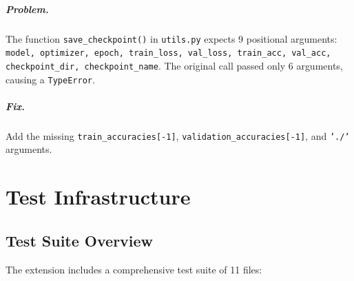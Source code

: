 \documentclass[11pt, a4paper]{report}
\begin{document}
\paragraph{Problem.} The function \texttt{save\_checkpoint()} in \texttt{utils.py} expects 9 positional arguments: \texttt{model, optimizer, epoch, train\_loss, val\_loss, train\_acc, val\_acc, checkpoint\_dir, checkpoint\_name}. The original call passed only 6 arguments, causing a \texttt{TypeError}.

\paragraph{Fix.} Add the missing \texttt{train\_accuracies[-1]}, \texttt{validation\_accuracies[-1]}, and \texttt{'./'} arguments.


\chapter{Test Infrastructure}
\label{ch:tests}

\section{Test Suite Overview}
\label{sec:test-overview}

The extension includes a comprehensive test suite of 11 files:
\end{document}
